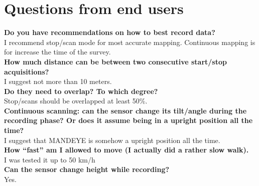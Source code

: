 \chapter{Questions from end users}

\textbf{Do you have recommendations on how to best record data?} \\
I recommend stop/scan mode for most accurate mapping.
Continuous mapping is for increase the time of the survey.  \\
\textbf{How much distance can be between two consecutive start/stop acquisitions?}\\
I suggest not more than 10 meters.\\
\textbf{Do they need to overlap? To which degree?}\\
Stop/scans should be overlapped at least 50\%.\\
\textbf{Continuous scanning: can the sensor change its tilt/angle during the recording phase? 
Or does it assume being in a upright position all the time?} \\
I suggest that MANDEYE  is somehow a upright position all the time. \\
\textbf{How “fast” am I allowed to move (I actually did a rather slow walk).} \\
I was tested it up to 50 km/h\\
\textbf{Can the sensor change height while recording?}\\
Yes.
